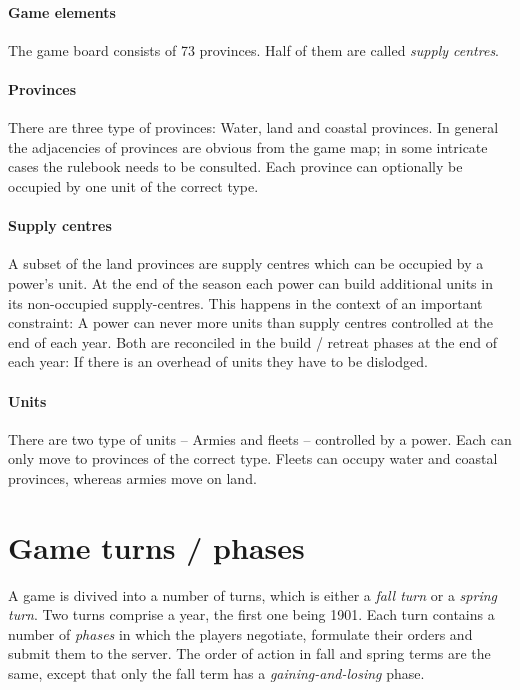 \documentclass[pdftex,12pt,a4paper]{report}
\begin{document}
\paragraph{Game elements}

The game board consists of 73 provinces. Half of them are 
called \textit{supply centres}.

\paragraph{Provinces}

There are three type of provinces: Water, land and coastal 
provinces. In general the adjacencies of provinces are obvious
from the game map; in some intricate cases the rulebook needs to
be consulted. Each province can optionally be occupied by one
unit of the correct type.

\paragraph{Supply centres}

A subset of the land provinces are supply centres which can be 
occupied by a power's unit. At the end of the season each power
can build additional units in its non-occupied supply-centres.
This happens in the context of an important constraint: A power 
can never more units than supply centres controlled at the end
of each year. Both are reconciled in the build / retreat phases
at the end of each year: If there is an overhead of units they
have to be dislodged.

\paragraph{Units}

There are two type of units -- Armies and fleets -- controlled
by a power. Each can only move to provinces of the correct type.
Fleets can occupy water and coastal provinces, whereas armies 
move on land.

\section{Game turns / phases}

A game is divived into a number of turns, which is either a
\textit{fall turn} or a \textit{spring turn}. Two turns comprise
a year, the first one being 1901. Each turn contains a number of 
\textit{phases} in which the players negotiate, formulate
their orders and submit them to the server. The order of action in
fall and spring terms are the same, except that only the fall term
has a \textit{gaining-and-losing} phase.
\end{document}
